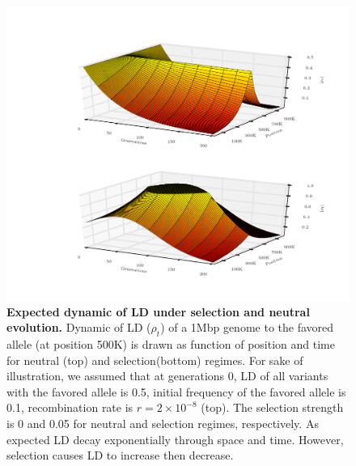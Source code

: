 \begin{figure}[H]
	\centering
	\includegraphics[width=\textwidth]{figures/LDDecay3d}
	\caption{ {\bf Expected dynamic of LD under selection and neutral 
	evolution.} Dynamic of LD ($\rho_t$) of a 1Mbp genome to the favored allele 
	(at position 500K) is drawn as function of position and time for neutral 
	(top) and selection(bottom) regimes.
	For sake of illustration, we assumed that at generations 0, LD of all 
	variants with the favored allele is 0.5, initial frequency of the favored 
	allele is 0.1, recombination rate is $r=2\times10^{-8}$ (top). The 
	selection strength is 0 and 0.05 for neutral and selection regimes, 
	respectively. As expected LD decay exponentially  through space and time. 
	However, selection causes LD to increase then decrease.}	
		\label{fig:ld3d}
\end{figure}

